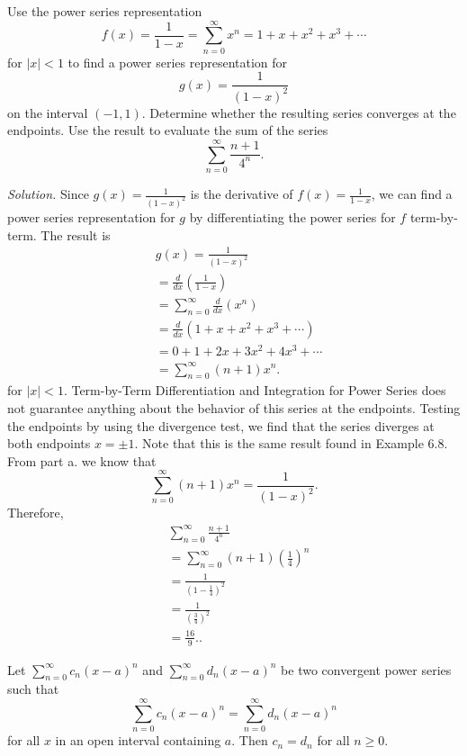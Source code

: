 \documentclass{report}
\begin{document}
    \bigbreak \noindent 
    \begin{exm}
        Use the power series representation
        \[ f(x) = \frac{1}{1-x} = \sum_{n=0}^{\infty} x^n = 1 + x + x^2 + x^3 + \cdots \]
        for \( |x| < 1 \) to find a power series representation for
        \[ g(x) = \frac{1}{(1-x)^2} \]
        on the interval \( (-1,1) \). Determine whether the resulting series converges at the endpoints.
        \bigbreak \noindent 
        Use the result to evaluate the sum of the series 
        \[ \sum_{n=0}^{\infty} \frac{n+1}{4^n}. \]
    \end{exm}

    \pagebreak \bigbreak \noindent 
    \textit{Solution.} Since \( g(x) = \frac{1}{(1-x)^2} \) is the derivative of \( f(x) = \frac{1}{1-x} \), we can find a power series representation for \( g \) by differentiating the power series for \( f \) term-by-term. The result is
    \begin{align*}
         &g(x) = \frac{1}{(1-x)^2} \\
         &= \frac{d}{dx}\left(\frac{1}{1-x}\right) \\
         &= \sum_{n=0}^{\infty} \frac{d}{dx}(x^n) \\
         &= \frac{d}{dx}(1 + x + x^2 + x^3 + \cdots) \\
         &= 0 + 1 + 2x + 3x^2 + 4x^3 + \cdots \\
         &= \sum_{n=0}^{\infty} (n+1)x^n 
    .\end{align*}
    for \( |x| < 1 \). Term-by-Term Differentiation and Integration for Power Series does not guarantee anything about the behavior of this series at the endpoints. Testing the endpoints by using the divergence test, we find that the series diverges at both endpoints \( x = \pm 1 \).
    Note that this is the same result found in Example 6.8.
    \bigbreak \noindent 
    From part a. we know that
    \[ \sum_{n=0}^{\infty} (n+1)x^n = \frac{1}{(1-x)^2}. \]
    Therefore,
    \begin{align*}
         &\sum_{n=0}^{\infty} \frac{n+1}{4^n}  \\
         &= \sum_{n=0}^{\infty} (n+1)\left(\frac{1}{4}\right)^n  \\
         &= \frac{1}{\left(1-\frac{1}{4}\right)^2}  \\
         &= \frac{1}{\left(\frac{3}{4}\right)^2}  \\
         &= \frac{16}{9}. 
    .\end{align*}

    \bigbreak \noindent 
    \begin{thrmm}
        Let $\sum_{n=0}^{\infty} c_n (x - a)^n$ and $\sum_{n=0}^{\infty} d_n (x - a)^n$ be two convergent power series such that
        \[
        \sum_{n=0}^{\infty} c_n (x - a)^n = \sum_{n=0}^{\infty} d_n (x - a)^n
        \]
        for all \( x \) in an open interval containing \( a \). Then \( c_n = d_n \) for all \( n \geq 0 \).
    \end{thrmm}
\end{document}
